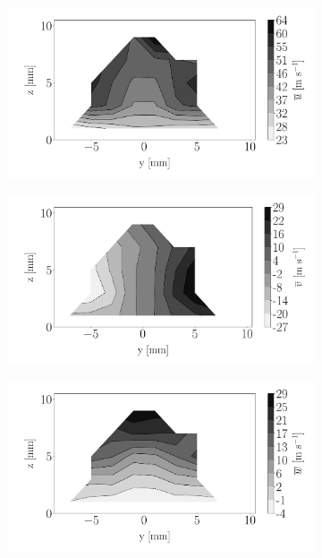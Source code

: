 \begin{figure}[h!]
\begin{subfigure}[b]{0.3\textwidth}
	\centering
   \includegraphics[scale=0.15]{./part2_developments/figures_ch5_resolved_JICF/injectors_SLI/uG75_dx20_x10_ux_mean_map}
\end{subfigure}
   \hspace{0.17in}
\begin{subfigure}[b]{0.3\textwidth}
	\centering
   \includegraphics[scale=0.15]{./part2_developments/figures_ch5_resolved_JICF/injectors_SLI/uG75_dx20_x10_uy_mean_map}
\end{subfigure}
   \hspace{0.17in}
\begin{subfigure}[b]{0.3\textwidth}
	\centering
   \includegraphics[scale=0.15]{./part2_developments/figures_ch5_resolved_JICF/injectors_SLI/uG75_dx20_x10_uz_mean_map}

\end{subfigure}
\end{figure}
